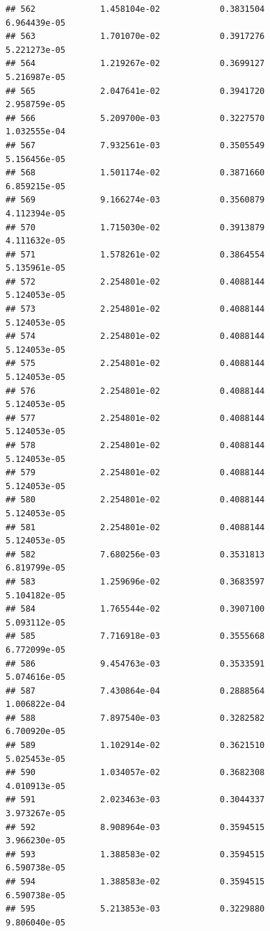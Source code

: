 \documentclass[
]{article}
\begin{document}
\begin{verbatim}
## 562             1.458104e-02            0.3831504            6.964439e-05
## 563             1.701070e-02            0.3917276            5.221273e-05
## 564             1.219267e-02            0.3699127            5.216987e-05
## 565             2.047641e-02            0.3941720            2.958759e-05
## 566             5.209700e-03            0.3227570            1.032555e-04
## 567             7.932561e-03            0.3505549            5.156456e-05
## 568             1.501174e-02            0.3871660            6.859215e-05
## 569             9.166274e-03            0.3560879            4.112394e-05
## 570             1.715030e-02            0.3913879            4.111632e-05
## 571             1.578261e-02            0.3864554            5.135961e-05
## 572             2.254801e-02            0.4088144            5.124053e-05
## 573             2.254801e-02            0.4088144            5.124053e-05
## 574             2.254801e-02            0.4088144            5.124053e-05
## 575             2.254801e-02            0.4088144            5.124053e-05
## 576             2.254801e-02            0.4088144            5.124053e-05
## 577             2.254801e-02            0.4088144            5.124053e-05
## 578             2.254801e-02            0.4088144            5.124053e-05
## 579             2.254801e-02            0.4088144            5.124053e-05
## 580             2.254801e-02            0.4088144            5.124053e-05
## 581             2.254801e-02            0.4088144            5.124053e-05
## 582             7.680256e-03            0.3531813            6.819799e-05
## 583             1.259696e-02            0.3683597            5.104182e-05
## 584             1.765544e-02            0.3907100            5.093112e-05
## 585             7.716918e-03            0.3555668            6.772099e-05
## 586             9.454763e-03            0.3533591            5.074616e-05
## 587             7.430864e-04            0.2888564            1.006822e-04
## 588             7.897540e-03            0.3282582            6.700920e-05
## 589             1.102914e-02            0.3621510            5.025453e-05
## 590             1.034057e-02            0.3682308            4.010913e-05
## 591             2.023463e-03            0.3044337            3.973267e-05
## 592             8.908964e-03            0.3594515            3.966230e-05
## 593             1.388583e-02            0.3594515            6.590738e-05
## 594             1.388583e-02            0.3594515            6.590738e-05
## 595             5.213853e-03            0.3229880            9.806040e-05

\end{verbatim}
\end{document}

